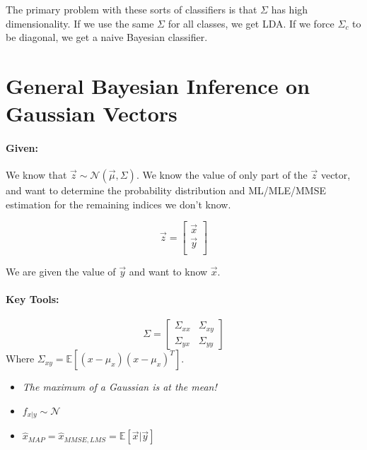 \documentclass[a4paper,12pt]{report}
\begin{document}
The primary problem with these sorts of classifiers is that $\Sigma$ has high dimensionality. If we use the same $\Sigma$ for all classes, we get LDA. If we force $\Sigma_c$ to be diagonal, we get a naive Bayesian classifier.






\section{General Bayesian Inference on Gaussian Vectors}

\paragraph{Given: } We know that $\vec z \sim \mathcal N(\vec \mu, \Sigma)$. We know the value of only part of the $\vec z$ vector, and want to determine the probability distribution and ML/MLE/MMSE estimation for the remaining indices we don't know. 

\begin{equation}
\vec z = \begin{bmatrix}
\vec x \\
\vec y \\
\end{bmatrix}
\end{equation}

We are given the value of $\vec y$ and want to know $\vec x$.

\paragraph{Key Tools: } 
\begin{equation}
\Sigma = \begin{bmatrix}
\Sigma_{xx} & \Sigma_{xy} \\
\Sigma_{yx} & \Sigma_{yy}
\end{bmatrix}
\end{equation}
Where $\Sigma_{xy} = \mathbb E[(x - \mu_x)(x - \mu_x)^T]$.

\begin{itemize}
\item \textit{The maximum of a Gaussian is at the mean!} 
\item $f_{x|y} \sim \mathcal N$
\item $\hat x_{MAP} = \hat x_{MMSE,LMS} = \mathbb E[\vec x | \vec y]$
\end{itemize}
\end{document}
